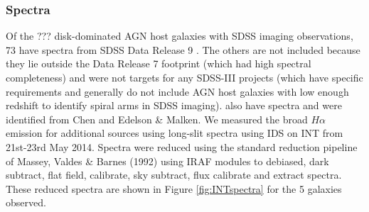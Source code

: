 \subsubsection{Spectra}\label{sec:spectra}

Of the ??? disk-dominated AGN host galaxies with SDSS imaging observations, 73 have spectra from SDSS Data Release 9 \citep{dr9_ref}. The others are not included because they lie outside the Data Release 7 footprint (which had high spectral completeness) and were not targets for any SDSS-III projects (which have specific requirements and generally do not include AGN host galaxies with low enough redshift to identify spiral arms in SDSS imaging). { also have spectra and were identified from Chen and Edelson \& Malken.}  We measured the broad $H\alpha$ emission for  { additional sources} using long-slit spectra using IDS on INT from 21st-23rd May 2014. Spectra were reduced using the standard reduction pipeline of Massey, Valdes \& Barnes (1992) using IRAF modules to debiased, dark subtract, flat field, calibrate, sky subtract, flux calibrate and extract spectra. These reduced spectra are shown in Figure \ref{fig:INTspectra} for the 5 galaxies observed.


